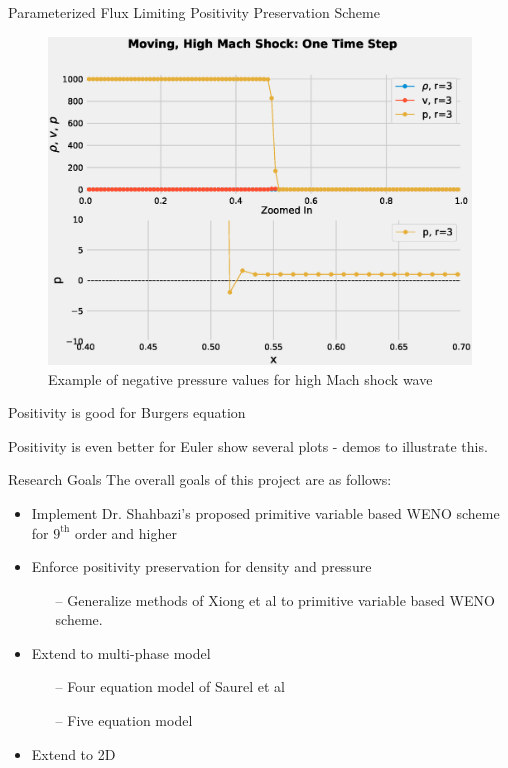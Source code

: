 \documentclass[9pt]{beamer}
\begin{document}
\begin{frame}{Parameterized Flux Limiting Positivity Preservation Scheme}
  \begin{figure}[H]
    \centering
    \includegraphics[scale=0.35]{PositivityZoom.eps}\caption{Example of negative pressure values for high Mach shock wave}
    \end{figure}
\end{frame}

\begin{frame}{Positivity is good for Burgers equation}
  
\end{frame}


\begin{frame}{Positivity is even better for Euler}
  show several plots - demos to illustrate this.
\end{frame}



\begin{frame}{Research Goals}
  The overall goals of this project are as follows:
  \begin{itemize}
  \item Implement Dr. Shahbazi's proposed primitive variable based WENO scheme \cite{Shahbazi} for $9^{\text{th}}$ order and higher
  \item Enforce positivity preservation for density and pressure
  \begin{itemize}
  \item[--] Generalize methods of Xiong et al \cite{Positivity2014} to primitive variable based WENO scheme.
  \end{itemize}
  \item Extend to multi-phase model
  \begin{itemize}
  \item[--] Four equation model of Saurel et al \cite{FourEquationModel}
  \item[--] Five equation model \cite{FiveEquationModel}
  \end{itemize}
  \item Extend to 2D
  \end{itemize}
\end{frame}
\end{document}
